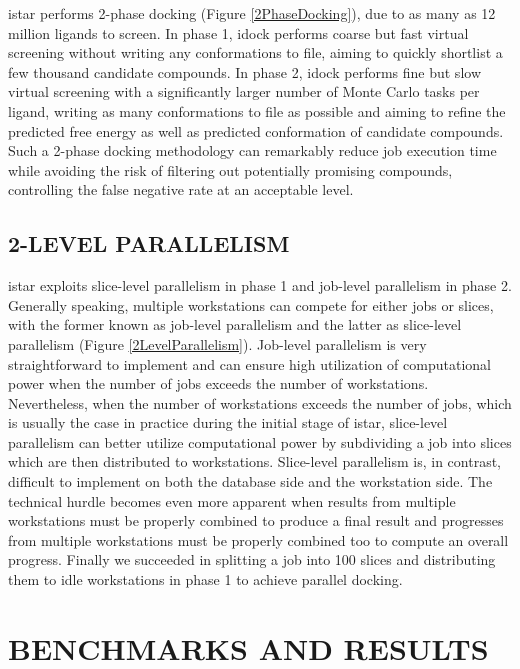 \documentclass[12pt]{article}
\begin{document}
istar performs 2-phase docking (Figure \ref{2PhaseDocking}), due to as many as 12 million ligands to screen. In phase 1, idock performs coarse but fast virtual screening without writing any conformations to file, aiming to quickly shortlist a few thousand candidate compounds. In phase 2, idock performs fine but slow virtual screening with a significantly larger number of Monte Carlo tasks per ligand, writing as many conformations to file as possible and aiming to refine the predicted free energy as well as predicted conformation of candidate compounds. Such a 2-phase docking methodology can remarkably reduce job execution time while avoiding the risk of filtering out potentially promising compounds, controlling the false negative rate at an acceptable level.

\subsection*{\sffamily \large 2-LEVEL PARALLELISM}

istar exploits slice-level parallelism in phase 1 and job-level parallelism in phase 2. Generally speaking, multiple workstations can compete for either jobs or slices, with the former known as job-level parallelism and the latter as slice-level parallelism (Figure \ref{2LevelParallelism}). Job-level parallelism is very straightforward to implement and can ensure high utilization of computational power when the number of jobs exceeds the number of workstations. Nevertheless, when the number of workstations exceeds the number of jobs, which is usually the case in practice during the initial stage of istar, slice-level parallelism can better utilize computational power by subdividing a job into slices which are then distributed to workstations. Slice-level parallelism is, in contrast, difficult to implement on both the database side and the workstation side. The technical hurdle becomes even more apparent when results from multiple workstations must be properly combined to produce a final result and progresses from multiple workstations must be properly combined too to compute an overall progress. Finally we succeeded in splitting a job into 100 slices and distributing them to idle workstations in phase 1 to achieve parallel docking.

\section*{\sffamily \Large BENCHMARKS AND RESULTS}
\end{document}
